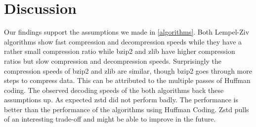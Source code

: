 \documentclass[
	12pt,
	a4paper,
	BCOR10mm,
	DIV14,
	listof=totoc,
	bibliography=totoc,
	headsepline
]{scrreprt}
\begin{document}
\FloatBarrier

\chapter{Discussion}
\label{Discussion}

Our findings support the assumptions we made in \ref{algorithms}. 
Both Lempel-Ziv algorithms show fast compression and decompression speeds while they have a rather small compression ratio while bzip2 and zlib have higher compression ratios but slow compression and decompression speeds. 
Surprisingly the compression speeds of bzip2 and zlib are similar, though bzip2 goes through more steps to compress data.
This can be attributed to the multiple passes of Huffman coding.
The observed decoding speeds of the both algorithms back these assumptions up.
As expected zstd did not perform badly.
The performance is better than the performance of the algorithms using Huffman Coding.
Zstd pulls of an interesting trade-off and might be able to improve in the future.
\end{document}
